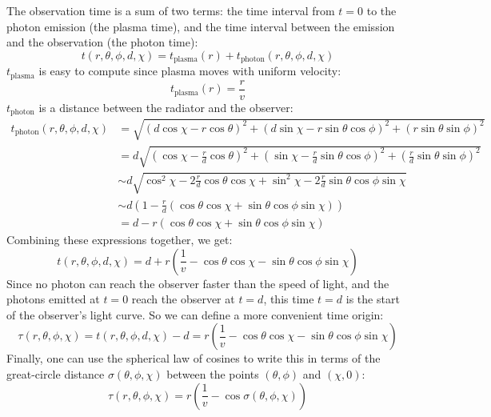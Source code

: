 \documentclass{article}
\begin{document}
The observation time is a sum of two terms: the time interval from $t
= 0$ to the photon emission (the plasma time), and the time interval
between the emission and the observation (the photon time):
\begin{equation*}
t\left(r, \theta, \phi, d, \chi\right) = t_\text{plasma}\left(r\right) + t_\text{photon}\left(r, \theta, \phi, d, \chi\right)
\end{equation*}
$t_\text{plasma}$ is easy to compute since plasma moves with uniform velocity:
\begin{equation*}
t_\text{plasma}\left(r\right) = \frac{r}{v}
\end{equation*}
$t_\text{photon}$ is a distance between the radiator and the observer:
\begin{align*}
t_\text{photon}\left(r, \theta, \phi, d, \chi\right) &= \sqrt{
	\left( d \cos\chi - r \cos\theta \right)^2 +
	\left( d \sin\chi - r \sin\theta \cos\phi \right)^2 +
	\left( r \sin\theta \sin\phi \right)^2
} \\
&= d\sqrt{
	\left( \cos\chi - \frac{r}{d} \cos\theta \right)^2 +
	\left( \sin\chi - \frac{r}{d} \sin\theta \cos\phi \right)^2 +
	\left(\frac{r}{d} \sin\theta \sin\phi \right)^2
} \\
&\sim d\sqrt{
	\cos^2{\chi} - 2\frac{r}{d} \cos\theta \cos\chi + \sin^2\chi - 2\frac{r}{d} \sin\theta \cos\phi \sin\chi
} \\
&\sim d\left(
	1 - 
	\frac{r}{d} \left( \cos\theta \cos\chi + \sin\theta \cos\phi \sin\chi \right)
\right) \\
&= d - r\left( \cos\theta \cos\chi + \sin\theta \cos\phi \sin\chi \right)
\end{align*}
Combining these expressions together, we get:
\begin{equation*}
t\left(r, \theta, \phi, d, \chi\right) = d + r\left( \frac{1}{v} - \cos\theta \cos\chi - \sin\theta \cos\phi \sin\chi \right)
\end{equation*}
Since no photon can reach the observer faster than the speed of light, and the photons emitted at $t = 0$ reach the observer at $t = d$, this time $t = d$ is the start of the observer's light curve. So we can define a more convenient time origin:
\begin{equation*}
\tau \left(r, \theta, \phi, \chi\right) = t\left(r, \theta, \phi, d, \chi\right) - d = r\left( \frac{1}{v} - \cos\theta \cos\chi - \sin\theta \cos\phi \sin\chi \right)
\end{equation*}
Finally, one can use the spherical law of cosines to write this in terms of the great-circle distance $\sigma\left( \theta, \phi, \chi \right)$ between the points $\left( \theta, \phi \right)$ and $\left( \chi, 0 \right)$:
\begin{equation}
\tau \left(r, \theta, \phi, \chi\right) = r\left( \frac{1}{v} - \cos\sigma\left( \theta, \phi, \chi \right) \right)
\end{equation}
\end{document}
